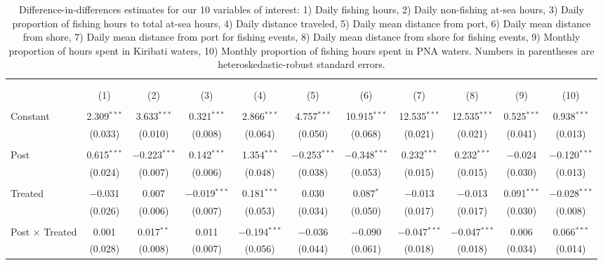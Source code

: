 
\begin{table}[!htbp] \centering 
  \caption{\label{tab:main_DID}Difference-in-differences estimates for our 10 variables of interest: 1) Daily fishing hours, 2) Daily non-fishing at-sea hours, 3) Daily proportion of fishing hours to total at-sea hours, 4) Daily distance traveled, 5) Daily mean distance from port, 6) Daily mean distance from shore, 7) Daily mean distance from port for fishing events, 8) Daily mean distance from shore for fishing events, 9) Monthly proportion of hours spent in Kiribati waters, 10) Monthly proportion of fishing hours spent in PNA waters. Numbers in parentheses are heteroskedastic-robust standard errors.} 
  \label{} 
\footnotesize 
\begin{tabular}{@{\extracolsep{1pt}}lcccccccccc} 
\\[-1.8ex]\hline 
\hline \\[-1.8ex] 
\\[-1.8ex] & (1) & (2) & (3) & (4) & (5) & (6) & (7) & (8) & (9) & (10)\\ 
\hline \\[-1.8ex] 
 Constant & 2.309$^{***}$ & 3.633$^{***}$ & 0.321$^{***}$ & 2.866$^{***}$ & 4.757$^{***}$ & 10.915$^{***}$ & 12.535$^{***}$ & 12.535$^{***}$ & 0.525$^{***}$ & 0.938$^{***}$ \\ 
  & (0.033) & (0.010) & (0.008) & (0.064) & (0.050) & (0.068) & (0.021) & (0.021) & (0.041) & (0.013) \\ 
  & & & & & & & & & & \\ 
 Post & 0.615$^{***}$ & $-$0.223$^{***}$ & 0.142$^{***}$ & 1.354$^{***}$ & $-$0.253$^{***}$ & $-$0.348$^{***}$ & 0.232$^{***}$ & 0.232$^{***}$ & $-$0.024 & $-$0.120$^{***}$ \\ 
  & (0.024) & (0.007) & (0.006) & (0.048) & (0.038) & (0.053) & (0.015) & (0.015) & (0.030) & (0.013) \\ 
  & & & & & & & & & & \\ 
 Treated & $-$0.031 & 0.007 & $-$0.019$^{***}$ & 0.181$^{***}$ & 0.030 & 0.087$^{*}$ & $-$0.013 & $-$0.013 & 0.091$^{***}$ & $-$0.028$^{***}$ \\ 
  & (0.026) & (0.006) & (0.007) & (0.053) & (0.034) & (0.050) & (0.017) & (0.017) & (0.030) & (0.008) \\ 
  & & & & & & & & & & \\ 
 Post $\times$ Treated & 0.001 & 0.017$^{**}$ & 0.011 & $-$0.194$^{***}$ & $-$0.036 & $-$0.090 & $-$0.047$^{***}$ & $-$0.047$^{***}$ & 0.006 & 0.066$^{***}$ \\ 
  & (0.028) & (0.008) & (0.007) & (0.056) & (0.044) & (0.061) & (0.018) & (0.018) & (0.034) & (0.014) \\ 

\end{tabular}
\end{table}
